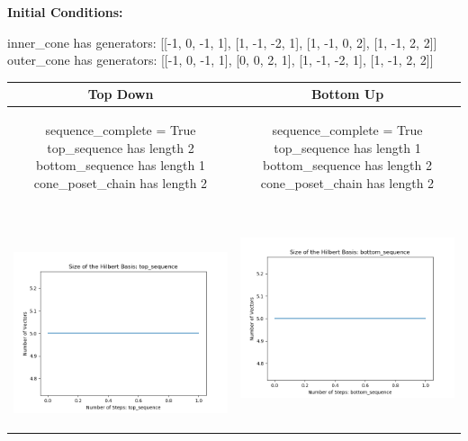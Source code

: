 \documentclass[10pt]{article}
\begin{document}
\textbf{Initial Conditions:}
\begin{SAGE}
inner_cone has generators: 
[[-1, 0, -1, 1], [1, -1, -2, 1], [1, -1, 0, 2], [1, -1, 2, 2]]
outer_cone has generators: 
[[-1, 0, -1, 1], [0, 0, 2, 1], [1, -1, -2, 1], [1, -1, 2, 2]]

\end{SAGE}
\begin{tabular}{c|c}
\textbf{Top Down} & \textbf{Bottom Up} \\ \hline  
\begin{SAGE}
	sequence_complete = True
	top_sequence has length 2
	bottom_sequence has length 1
	cone_poset_chain has length 2
\end{SAGE} 
&
\begin{SAGE}
	sequence_complete = True
	top_sequence has length 1
	bottom_sequence has length 2
	cone_poset_chain has length 2
\end{SAGE} 
\\ \hline
\
\begin{minipage}{.45\textwidth}
\includegraphics[width=\textwidth]{"DATA/4d/4 generators 2 bound F/top_sequence SIZE"}
\end{minipage} &
\begin{minipage}{.45\textwidth}
\includegraphics[width=\textwidth]{"DATA/4d/4 generators 2 bound F bottomup/bottom_sequence SIZE"}

\end{minipage}
\end{tabular}
\end{document}
